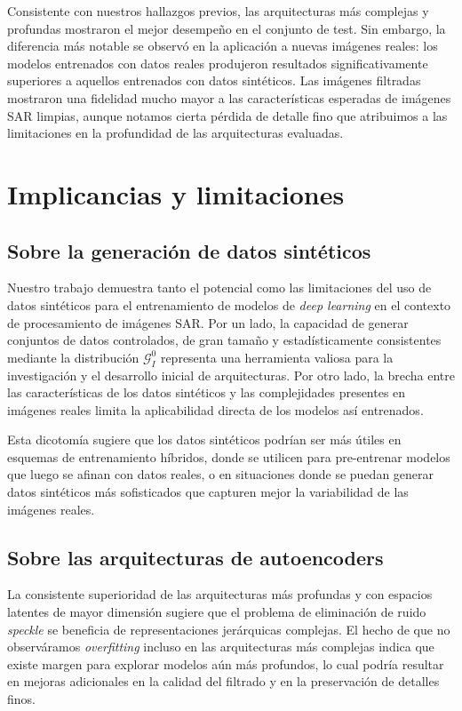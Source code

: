 Consistente con nuestros hallazgos previos, las arquitecturas más complejas y profundas mostraron el mejor desempeño en el conjunto de test. Sin embargo, la diferencia más notable se observó en la aplicación a nuevas imágenes reales: los modelos entrenados con datos reales produjeron resultados significativamente superiores a aquellos entrenados con datos sintéticos. Las imágenes filtradas mostraron una fidelidad mucho mayor a las características esperadas de imágenes SAR limpias, aunque notamos cierta pérdida de detalle fino que atribuimos a las limitaciones en la profundidad de las arquitecturas evaluadas.

\section{Implicancias y limitaciones}

\subsection{Sobre la generación de datos sintéticos}

Nuestro trabajo demuestra tanto el potencial como las limitaciones del uso de datos sintéticos para el entrenamiento de modelos de \emph{deep learning} en el contexto de procesamiento de imágenes SAR. Por un lado, la capacidad de generar conjuntos de datos controlados, de gran tamaño y estadísticamente consistentes mediante la distribución $\mathcal{G}_I^0$ representa una herramienta valiosa para la investigación y el desarrollo inicial de arquitecturas. Por otro lado, la brecha entre las características de los datos sintéticos y las complejidades presentes en imágenes reales limita la aplicabilidad directa de los modelos así entrenados.

Esta dicotomía sugiere que los datos sintéticos podrían ser más útiles en esquemas de entrenamiento híbridos, donde se utilicen para pre-entrenar modelos que luego se afinan con datos reales, o en situaciones donde se puedan generar datos sintéticos más sofisticados que capturen mejor la variabilidad de las imágenes reales.

\subsection{Sobre las arquitecturas de autoencoders}

La consistente superioridad de las arquitecturas más profundas y con espacios latentes de mayor dimensión sugiere que el problema de eliminación de ruido \emph{speckle} se beneficia de representaciones jerárquicas complejas. El hecho de que no observáramos \emph{overfitting} incluso en las arquitecturas más complejas indica que existe margen para explorar modelos aún más profundos, lo cual podría resultar en mejoras adicionales en la calidad del filtrado y en la preservación de detalles finos.


